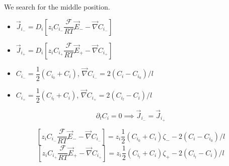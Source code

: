 \documentclass[aps,12pt]{revtex4}
\begin{document}
We search for the middle position.
\begin{itemize}
	\item $\vec{J}_{i_-} = D_i \left[z_i C_{i_-}  \dfrac{\mathcal{F}}{RT} \vec{E}_- - \vec{\nabla} C_{i_-} \right]$
	\item $\vec{J}_{i_+} = D_i \left[z_i C_{i_+}  \dfrac{\mathcal{F}}{RT} \vec{E}_+ - \vec{\nabla} C_{i_+} \right]$
	\item $C_{i_-}=\dfrac{1}{2}(C_{i_0}+C_i)$, $\vec{\nabla} C_{i_-} = 2(C_i-C_{i_0})/l$
	\item $C_{i_+}=\dfrac{1}{2}(C_{i_l}+C_i)$, $\vec{\nabla} C_{i_+} = 2(C_{i_l}-C_i)/l$
\end{itemize}

$$\partial_t C_i = 0 \implies \vec{J}_{i_-} = \vec{J}_{i_+}$$

$$
	 	\left[z_i C_{i_-}  \dfrac{\mathcal{F}}{RT} \vec{E}_- - \vec{\nabla} C_{i_-} \right] = z_i \dfrac{1}{2} (C_{i_0}+C_i) \zeta_- - 2(C_i-C_{i_0})/l
$$
$$
   \left[z_i C_{i_+}  \dfrac{\mathcal{F}}{RT} \vec{E}_+ - \vec{\nabla} C_{i_+} \right] 
 =  z_i \dfrac{1}{2} (C_{i_l}+C_i) \zeta_+ - 2(C_{i_l}-C_i)/l
$$
\end{document}
